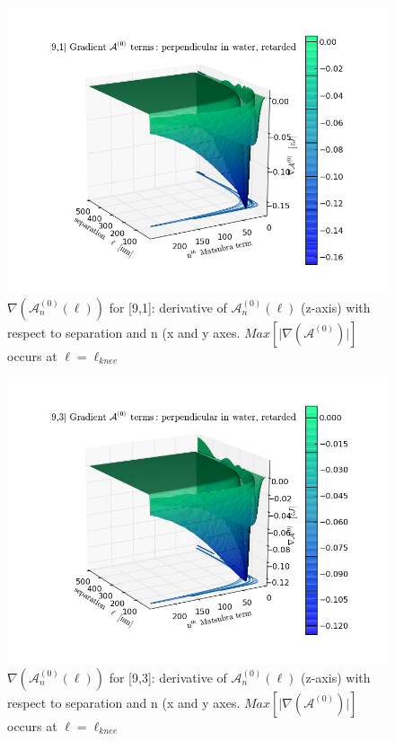 \documentclass[a4paper]{article}
\begin{document}
\begin{center}
\begin{figure}[t!]
\begin{center}
\includegraphics[width=1.4\textwidth]{plots/grad_A0_91.png}
\hskip 43pt
\caption{$\nabla(\mathcal{A}_{n}^{(0)}(\ell))$ for [9,1]: derivative of
$\mathcal{A}_{n}^{(0)}(\ell)$ (z-axis) with respect to separation and n (x and
y axes. $Max[\lvert \nabla(\mathcal{A}^{(0)}) \rvert]$ occurs at
$\ell=\ell_{knee}$}
\label{eiz65}
\end{center}
\end{figure} 

\begin{figure}[t!]
\begin{center}
\includegraphics[width=1.4\textwidth]{plots/grad_A0_93.png}
\hskip 43pt
\caption{$\nabla(\mathcal{A}_{n}^{(0)}(\ell))$ for [9,3]: derivative of
$\mathcal{A}_{n}^{(0)}(\ell)$ (z-axis) with respect to separation and n (x and
y axes. $Max[\lvert \nabla(\mathcal{A}^{(0)}) \rvert]$ occurs at
$\ell=\ell_{knee}$}
\label{eiz65}
\end{center}
\end{figure} 


\end{center}
\end{document}
